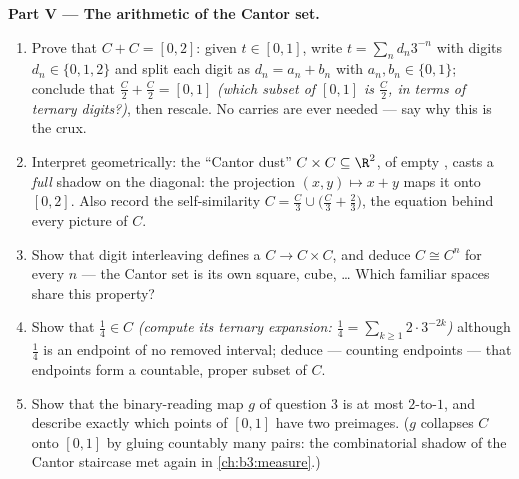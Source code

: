 \begin{problem}
\medskip
\noindent\textbf{Part V --- The arithmetic of the Cantor set.}
\begin{enumerate}[resume]
  \item Prove that $C + C = [0, 2]$: given $t \in [0, 1]$,
        write $t = \sum_n d_n3^{-n}$ with digits $d_n \in \{0,
        1, 2\}$ and split each digit as $d_n = a_n + b_n$ with
        $a_n, b_n \in \{0, 1\}$; conclude that $\frac C2 +
        \frac C2 = [0, 1]$ \emph{(which subset of $[0,1]$ is
        $\frac C2$, in terms of ternary digits?)}, then rescale.
        No carries are ever needed --- say why this is the crux.
  \item Interpret geometrically: the ``Cantor dust'' $C \times
        C \subseteq \R^2$, of empty , casts a
        \emph{full} shadow on the diagonal: the projection $(x,
        y) \mapsto x + y$ maps it onto $[0, 2]$. Also record
        the self-similarity $C = \frac C3 \cup \bigl(\frac C3 +
        \frac23\bigr)$, the equation behind every picture of
        $C$.
  \item Show that digit interleaving defines a  $C
        \to C \times C$, and deduce $C \cong C^n$ for every $n$
        --- the Cantor set is its own square, cube, \dots{}
        Which familiar spaces share this property?
  \item Show that $\frac14 \in C$ \emph{(compute its ternary
        expansion: $\frac14 = \sum_{k\geq1} 2\cdot3^{-2k}$)}
        although $\frac14$ is an endpoint of no removed
        interval; deduce --- counting endpoints --- that
        endpoints form a countable, proper subset of $C$.
  \item Show that the binary-reading map $g$ of question 3 is
        at most $2$-to-$1$, and describe exactly which points
        of $[0,1]$ have two preimages. ($g$ collapses $C$ onto
        $[0,1]$ by gluing countably many pairs: the
        combinatorial shadow of the Cantor staircase met again
        in \cref{ch:b3:measure}.)
\end{enumerate}


\end{problem}
